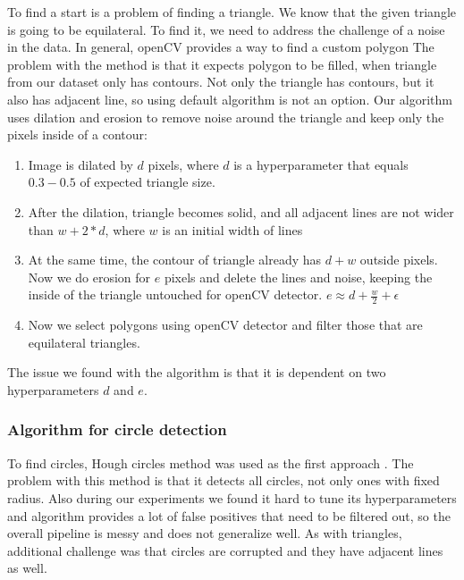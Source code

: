 \documentclass[a4paper,12pt]{extarticle}
\begin{document}
To find a start is a problem of finding a triangle.
We know that the given triangle is going to be equilateral.
To find it, we need to address the challenge of a noise in the data.
In general, openCV provides a way to find a custom polygon \cite{findcontours}
The problem with the method is that it expects polygon to be filled, when triangle from our dataset only has contours.
Not only the triangle has contours, but it also has adjacent line, so using default algorithm is not an option.
Our algorithm uses dilation and erosion to remove noise around the triangle and keep only the pixels inside of a contour:
\begin{enumerate}
    \item Image is dilated by $d$ pixels, where $d$ is a hyperparameter that equals $0.3-0.5$ of expected triangle size.
    \item After the dilation, triangle becomes solid, and all adjacent lines are not wider than $w + 2 * d$, where $w$ is an initial width of lines
    \item At the same time, the contour of triangle already has $d + w$ outside pixels. Now we do erosion for $e$ pixels and delete the lines and noise, keeping the inside of the triangle untouched for openCV detector. $e \approx d + \frac{w}{2} + \epsilon$
    \item Now we select polygons using openCV detector and filter those that are equilateral triangles.
\end{enumerate}

The issue we found with the algorithm is that it is dependent on two hyperparameters $d$ and $e$.

\subsubsection{Algorithm for circle detection}

To find circles, Hough circles method was used as the first approach \cite{houghcircles}.
The problem with this method is that it detects all circles, not only ones with fixed radius.
Also during our experiments we found it hard to tune its hyperparameters and algorithm provides a lot of false positives that need to be filtered out, so the overall pipeline is messy and does not generalize well.
As with triangles, additional challenge was that circles are corrupted and they have adjacent lines as well.
\end{document}
